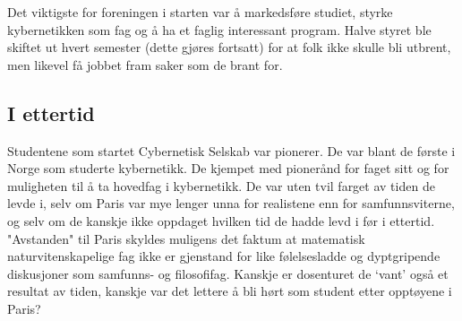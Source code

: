 \documentclass[../main.tex]{subfiles}
\begin{document}
Det viktigste for foreningen i starten var å markedsføre studiet, styrke kybernetikken som fag og å ha et faglig interessant program. Halve styret ble skiftet ut hvert semester (dette gjøres fortsatt) for at folk ikke skulle bli utbrent, men likevel få jobbet fram saker som de brant for.

\subsection{I ettertid}
Studentene som startet Cybernetisk Selskab var pionerer. De var blant de første i Norge som studerte kybernetikk. De kjempet med pionerånd for faget sitt og for muligheten til å ta hovedfag i kybernetikk. De var uten tvil farget av tiden de levde i, selv om Paris var mye lenger unna for realistene enn for samfunnsviterne, og selv om de kanskje ikke oppdaget hvilken tid de hadde levd i før i ettertid. "Avstanden" til Paris skyldes muligens det faktum at matematisk naturvitenskapelige fag ikke er gjenstand for like følelsesladde og dyptgripende diskusjoner som samfunns- og filosofifag. Kanskje er dosenturet de `vant' også et resultat av tiden, kanskje var det lettere å bli hørt som student etter opptøyene i Paris?
\end{document}
